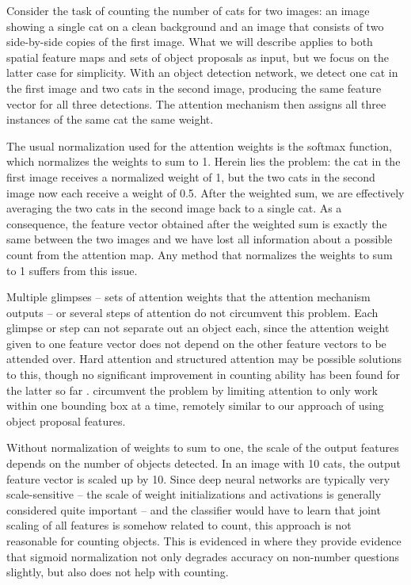 \documentclass[letterpaper]{article}
\begin{document}
Consider the task of counting the number of cats for two images: an image showing a single cat on a clean background and an image that consists of two side-by-side copies of the first image.
What we will describe applies to both spatial feature maps and sets of object proposals as input, but we focus on the latter case for simplicity.
With an object detection network, we detect one cat in the first image and two cats in the second image, producing the same feature vector for all three detections.
The attention mechanism then assigns all three instances of the same cat the same weight.

The usual normalization used for the attention weights is the softmax function, which normalizes the weights to sum to 1.
Herein lies the problem:
the cat in the first image receives a normalized weight of 1, but the two cats in the second image now each receive a weight of 0.5.
After the weighted sum, we are effectively averaging the two cats in the second image back to a single cat.
As a consequence, the feature vector obtained after the weighted sum is exactly the same between the two images and we have lost all information about a possible count from the attention map.
Any method that normalizes the weights to sum to 1 suffers from this issue.

Multiple glimpses \citep{Larochelle2010a} -- sets of attention weights that the attention mechanism outputs -- or several steps of attention \citep{Yang2015a, Lu2016a} do not circumvent this problem.
Each glimpse or step can not separate out an object each, since the attention weight given to one feature vector does not depend on the other feature vectors to be attended over.
Hard attention \citep{Ba2014a, Mnih2014a} and structured attention \citep{Kim2017b} may be possible solutions to this, though no significant improvement in counting ability has been found for the latter so far \citep{Zhu2017a}.
\citet{Ren2017a} circumvent the problem by limiting attention to only work within one bounding box at a time, remotely similar to our approach of using object proposal features.

Without normalization of weights to sum to one, the scale of the output features depends on the number of objects detected.
In an image with 10 cats, the output feature vector is scaled up by 10.
Since deep neural networks are typically very scale-sensitive -- the scale of weight initializations and activations is generally considered quite important \citep{Mishkin2016a} -- and the classifier would have to learn that joint scaling of all features is somehow related to count, this approach is not reasonable for counting objects.
This is evidenced in \citet{Teney2017a} where they provide evidence that sigmoid normalization not only degrades accuracy on non-number questions slightly, but also does not help with counting.
\end{document}
